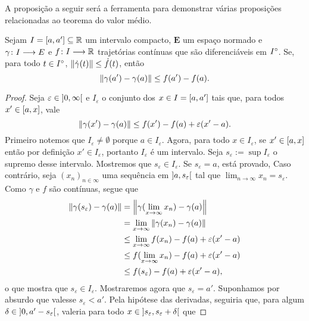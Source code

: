 A proposição a seguir será a ferramenta para demonstrar várias proposições relacionadas ao teorema do valor médio.

\begin{proposition}
\label{prop:majoracao.trajetoria}
Sejam $I=\left[{a},{a'}\right] \subseteq \mathbb{R}$ um intervalo compacto, $\bm E$ um espaço normado e ${\gamma}\colon {I} \longrightarrow {E}$ e ${f}\colon {I} \longrightarrow {\mathbb{R}}$ trajetórias contínuas que são diferenciáveis em ${I}^\circ$. Se, para todo $t \in {I}^\circ$, $\left\Vert{\dot \gamma(t)}\right\Vert \leq \dot f(t)$, então
	\begin{equation*}
	\left\Vert{\gamma(a') - \gamma(a)}\right\Vert \leq f(a') - f(a).
	\end{equation*}
\end{proposition}
\begin{proof}
Seja $\varepsilon \in \left]{0},{\infty}\right[$ e $I_\varepsilon$ o conjunto dos $x \in I = \left[{a},{a'}\right]$ tais que, para todos $x' \in \left[{a},{x}\right]$, vale
	\begin{equation*}
	\left\Vert{\gamma(x') - \gamma(a)}\right\Vert \leq f(x') - f(a) + \varepsilon(x'-a).
	\end{equation*}
Primeiro notemos que $I_\varepsilon \neq \emptyset$ porque $a \in I_\varepsilon$. Agora, para todo $x \in I_\varepsilon$, se $x' \in \left[{a},{x}\right]$ então por definição $x' \in I_\varepsilon$, portanto $I_\varepsilon$ é um intervalo. Seja $s_\varepsilon := \sup I_\varepsilon$ o supremo desse intervalo. Mostremos que $s_\varepsilon \in I_\varepsilon$. Se $s_\varepsilon = a$, está provado, Caso contrário, seja $(x_n)_{n \in \infty}$ uma sequência em $\left]{a},{s_\varepsilon}\right[$ tal que $\lim_{n \to \infty} x_n = s_\varepsilon$. Como $\gamma$ e $f$ são contínuas, segue que
	\begin{align*}
	\left\Vert{\gamma(s_\varepsilon) - \gamma(a)}\right\Vert &= \left\Vert{\gamma(\lim_{x \to \infty} x_n) - \gamma(a)}\right\Vert \\
		&= \lim_{x \to \infty} \left\Vert{\gamma(x_n) - \gamma(a)}\right\Vert \\
		&\leq \lim_{x \to \infty} f(x_n) - f(a) + \varepsilon(x'-a) \\
		&\leq f(\lim_{x \to \infty} x_n) - f(a) + \varepsilon(x'-a) \\
		&\leq f(s_\varepsilon) - f(a) + \varepsilon(x'-a),
	\end{align*}
o que mostra que $s_\varepsilon \in I_\varepsilon$. Mostraremos agora que $s_\varepsilon = a'$. Suponhamos por absurdo que valesse $s_\varepsilon < a'$. Pela hipótese das derivadas, seguiria que, para algum $\delta \in \left]{0},{a'-s_\varepsilon}\right[$, valeria para todo $x \in \left]{s_\varepsilon},{s_\varepsilon+\delta}\right[$ que

\end{proof}
